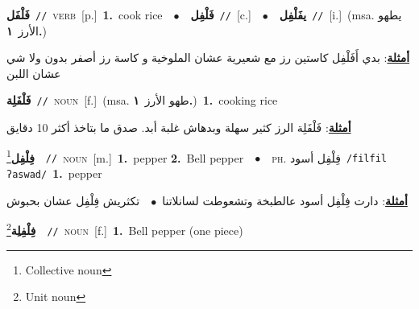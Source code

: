 \documentclass[10pt,a4paper,twoside]{article} %
\begin{document}
\begin{multicols}{2}
{\setlength\topsep{0pt}\textbf{\foreignlanguage{arabic}{فَلْفَل}}\ {\color{gray}\texttt{//}\color{black}}\ \textsc{verb}\ [p.]\ \textbf{1.}~cook rice\ \ $\bullet$\ \ \setlength\topsep{0pt}\textbf{\foreignlanguage{arabic}{فَلْفِل}}\ {\color{gray}\texttt{//}\color{black}}\ [c.]\ \ $\bullet$\ \ \setlength\topsep{0pt}\textbf{\foreignlanguage{arabic}{يفَلْفِل}}\ {\color{gray}\texttt{//}\color{black}}\ [i.]\ \color{gray}(msa. \foreignlanguage{arabic}{يطهو الأرز}~\foreignlanguage{arabic}{\textbf{١.}})\color{black}\  \begin{flushright}\color{gray}\foreignlanguage{arabic}{\textbf{\underline{\foreignlanguage{arabic}{أمثلة}}}: بدي أَفَلْفِل كاستين رز مع شعيرية عشان الملوخية و كاسة رز أصفر بدون ولا شي عشان اللبن}\end{flushright}\color{black}} \vspace{2mm}

{\setlength\topsep{0pt}\textbf{\foreignlanguage{arabic}{فَلْفَلِة}}\ {\color{gray}\texttt{//}\color{black}}\ \textsc{noun}\ [f.]\ \color{gray}(msa. \foreignlanguage{arabic}{طهو الأرز}~\foreignlanguage{arabic}{\textbf{١.}})\color{black}\ \textbf{1.}~cooking rice\  \begin{flushright}\color{gray}\foreignlanguage{arabic}{\textbf{\underline{\foreignlanguage{arabic}{أمثلة}}}: فَلْفَلِة الرز كثير سهلة وبدهاش غلبة أبد. صدق ما بتاخذ أكثر 10 دقايق}\end{flushright}\color{black}} \vspace{2mm}

{\setlength\topsep{0pt}\textbf{\foreignlanguage{arabic}{فِلْفِل}}\footnote{Collective noun}\ \ {\color{gray}\texttt{//}\color{black}}\ \textsc{noun}\ [m.]\ \textbf{1.}~pepper  \textbf{2.}~Bell pepper\ \ $\bullet$\ \ \textsc{ph.} \color{gray} \foreignlanguage{arabic}{فِلْفِل أسود}\color{black}\ {\color{gray}\texttt{/{\sffamily filfil ʔaswad}/}\color{black}}\ \textbf{1.}~pepper\  \begin{flushright}\color{gray}\foreignlanguage{arabic}{\textbf{\underline{\foreignlanguage{arabic}{أمثلة}}}: دارت فِلْفِل أسود عالطبخة وتشعوطت لسانلاتنا\ $\bullet$\ \  تكثريش فِلْفِل عشان بحبوش}\end{flushright}\color{black}} \vspace{2mm}

{\setlength\topsep{0pt}\textbf{\foreignlanguage{arabic}{فِلْفِلِة}}\footnote{Unit noun}\ \ {\color{gray}\texttt{//}\color{black}}\ \textsc{noun}\ [f.]\ \textbf{1.}~Bell pepper (one piece)\ } \vspace{2mm}


\end{multicols}
\end{document}
